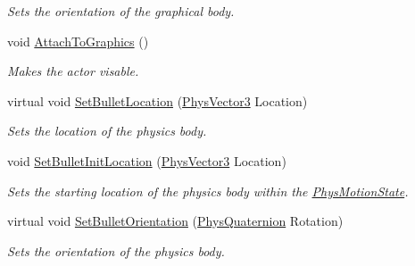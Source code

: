 \begin{DoxyCompactItemize}
\begin{DoxyCompactList}\small\item\em Sets the orientation of the graphical body. \item\end{DoxyCompactList}\item 
void \hyperlink{classActorBase_afab604970fede16ccde0c6b8e72d9ee0}{AttachToGraphics} ()
\begin{DoxyCompactList}\small\item\em Makes the actor visable. \item\end{DoxyCompactList}\item 
virtual void \hyperlink{classActorBase_af64a57138bbd32c52581a5c8d0d29a76}{SetBulletLocation} (\hyperlink{classPhysVector3}{PhysVector3} Location)
\begin{DoxyCompactList}\small\item\em Sets the location of the physics body. \item\end{DoxyCompactList}\item 
void \hyperlink{classActorBase_af52177760d530df2b0987ed8626a656d}{SetBulletInitLocation} (\hyperlink{classPhysVector3}{PhysVector3} Location)
\begin{DoxyCompactList}\small\item\em Sets the starting location of the physics body within the \hyperlink{classPhysMotionState}{PhysMotionState}. \item\end{DoxyCompactList}\item 
virtual void \hyperlink{classActorBase_adf817bd5a7c562f31f6724a06a3a0f79}{SetBulletOrientation} (\hyperlink{classPhysQuaternion}{PhysQuaternion} Rotation)
\begin{DoxyCompactList}\small\item\em Sets the orientation of the physics body. \item\end{DoxyCompactList}\end{DoxyCompactItemize}
